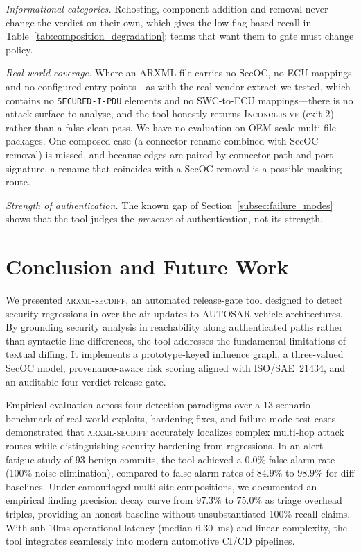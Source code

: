 \documentclass[journal]{IEEEtran}
\begin{document}
\emph{Informational categories.} Rehosting, component addition and removal never
change the verdict on their own, which gives the low flag-based recall in
Table~\ref{tab:composition_degradation}; teams that want them to gate must change policy.

\emph{Real-world coverage.} Where an ARXML file carries no SecOC, no ECU
mappings and no configured entry points---as with the real vendor extract we
tested, which contains no \texttt{SECURED-I-PDU} elements and no SWC-to-ECU
mappings---there is no attack surface to analyse, and the tool honestly returns
\textsc{Inconclusive} (exit $2$) rather than a false clean pass. We have no
evaluation on OEM-scale multi-file packages. One composed case (a connector
rename combined with SecOC removal) is missed, and because edges are paired by
connector path and port signature, a rename that coincides with a SecOC removal
is a possible masking route.

\emph{Strength of authentication.} The known gap of Section~\ref{subsec:failure_modes}
shows that the tool judges the \emph{presence} of authentication, not its
strength.

\section{Conclusion and Future Work}
\label{sec:conclusion}

We presented \textsc{arxml-secdiff}, an automated release-gate tool designed to detect security regressions in over-the-air updates to AUTOSAR vehicle architectures. By grounding security analysis in reachability along authenticated paths rather than syntactic line differences, the tool addresses the fundamental limitations of textual diffing. It implements a prototype-keyed influence graph, a three-valued SecOC model, provenance-aware risk scoring aligned with ISO/SAE~21434, and an auditable four-verdict release gate.

Empirical evaluation across four detection paradigms over a 13-scenario benchmark of real-world exploits, hardening fixes, and failure-mode test cases demonstrated that \textsc{arxml-secdiff} accurately localizes complex multi-hop attack routes while distinguishing security hardening from regressions. In an alert fatigue study of 93 benign commits, the tool achieved a $0.0\%$ false alarm rate (100\% noise elimination), compared to false alarm rates of $84.9\%$ to $98.9\%$ for diff baselines. Under camouflaged multi-site compositions, we documented an empirical finding precision decay curve from $97.3\%$ to $75.0\%$ as triage overhead triples, providing an honest baseline without unsubstantiated 100\% recall claims. With sub-10ms operational latency (median $6.30$~ms) and linear complexity, the tool integrates seamlessly into modern automotive CI/CD pipelines.
\end{document}
